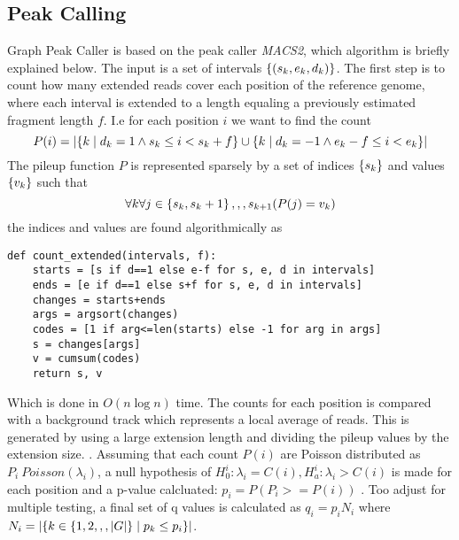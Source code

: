 \subsection{Peak Calling}
Graph Peak Caller is based on the peak caller \emph{MACS2}, which algorithm is briefly explained below. 
The input is a set of intervals $\left\{(s_k, e_k, d_k)\right\}$. The first step is to count how many extended reads cover each position of the reference genome, where each interval is extended to a length equaling a previously estimated fragment length $f$. I.e for each position $i$ we want to find the count
$$P(i)= \left|\left\{k \mid d_k=1 \wedge s_k \leq i < s_k+f\right\} \cup \left\{k \mid d_k=-1 \wedge e_k-f \leq i < e_k\right\}\right|$$
  The pileup function $P$ is represented sparsely by a set of indices $\left\{s_k\right\}$ and values $\left\{v_k\right\}$ such that $$\forall{k}\forall{j\in\left\{s_k, s_k+1\right\},,,s_{k+1}}(P(j) = v_k)$$
  the indices and values are found algorithmically as
  \begin{lstlisting}
def count_extended(intervals, f):    
    starts = [s if d==1 else e-f for s, e, d in intervals]
    ends = [e if d==1 else s+f for s, e, d in intervals]
    changes = starts+ends
    args = argsort(changes)
    codes = [1 if arg<=len(starts) else -1 for arg in args]
    s = changes[args]
    v = cumsum(codes)
    return s, v
  \end{lstlisting}
  Which is done in $O(n \log n)$ time. The counts for each position is compared with a background track which represents a local average of reads. This is generated by using a large extension length and dividing the pileup values by the extension size.
  .
  Assuming that each count $P(i)$ are Poisson distributed as $P_i ~ Poisson(\lambda_i)$, a null hypothesis of $H_0^i: \lambda_i=C(i), H_a^i:\lambda_i>C(i)$ is made for each position and a p-value calcluated: $p_i = P(P_i>=P(i))$ . Too adjust for multiple testing, a final set of q values is calculated as $q_i = p_iN_i$ where $N_i = \left|\left\{k\in\left\{1, 2,,,\left|G\right|\right\} \mid p_k\leq p_i\right\}\right|$.
  
